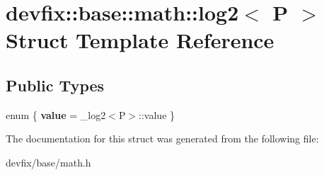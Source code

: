 \hypertarget{structdevfix_1_1base_1_1math_1_1log2}{}\section{devfix\+:\+:base\+:\+:math\+:\+:log2$<$ P $>$ Struct Template Reference}
\label{structdevfix_1_1base_1_1math_1_1log2}
\subsection*{Public Types}
\begin{DoxyCompactItemize}
\item 
\mbox{\label{structdevfix_1_1base_1_1math_1_1log2_a75770853baf4a4a18b541c864758cbf1}} 
enum \{ {\bfseries value} = \+\_\+log2$<$P$>$\+:\+:value
 \}
\end{DoxyCompactItemize}


The documentation for this struct was generated from the following file\+:\begin{DoxyCompactItemize}
\item 
devfix/base/math.\+h\end{DoxyCompactItemize}
